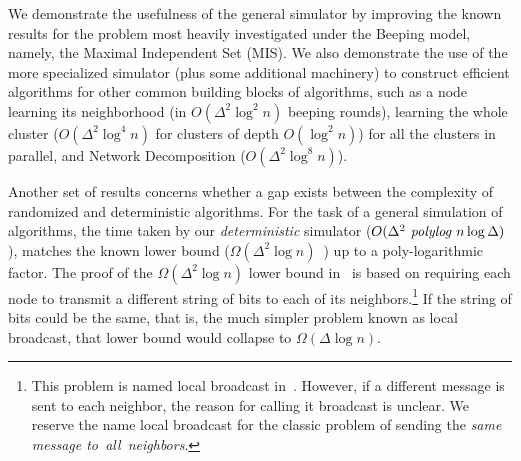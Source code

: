We demonstrate the usefulness of the general simulator by improving the known results for the problem most heavily investigated under the Beeping model, namely, the Maximal Independent Set (MIS). We also demonstrate the use of the more specialized simulator (plus some additional machinery) to construct efficient algorithms for other common building blocks of algorithms, such as a node learning its neighborhood (in $O(\Delta^2 \log^2 n)$ beeping rounds), 
learning the whole cluster  ($O(\Delta^2 \log^4 n)$ for clusters of depth $O(\log ^2 n)$) for all the clusters in parallel, 
and Network Decomposition ($O(\Delta^2 \log^8 n)$). 

 

Another set of results concerns whether a gap exists between the complexity of randomized and deterministic algorithms. For the task of a general simulation of \congest algorithms, the time taken by our \emph{deterministic} simulator 
%
($O(\Delta ^2 \text{\em\ polylog } n \log \Delta )$),  
matches the known lower bound ($\Omega(\Delta^2 \log n)$~\cite{davies2023optimal}) up to a poly-logarithmic factor. 
%
The proof of the $\Omega(\Delta^2 \log n)$ lower bound in~\cite{davies2023optimal} is based on requiring each node to transmit a different string of bits to each of its neighbors.\footnote{This problem is 
named local broadcast 
in~\cite{davies2023optimal}.
However, 
if a different message is sent to each neighbor, the reason for calling it broadcast is unclear. 
We reserve the name local broadcast for the classic problem of sending the {\em same message to~all~neighbors}.} If the string of bits could be the same, that is, the much simpler problem known as local broadcast, that lower bound would collapse to $\Omega(\Delta \log n)$.
%



